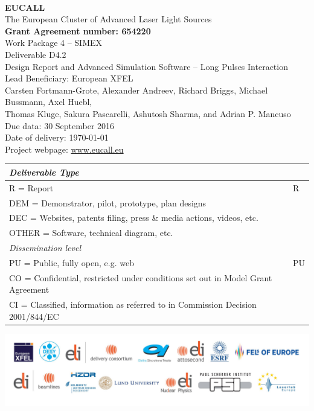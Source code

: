 \documentclass[10pt]{scrartcl}
\begin{document}
\makeatletter
\begin{titlepage}
\thispagestyle{scrheadings}
\begin{center}
$~$\\
\vspace{0cm}
{\Large\textbf{EUCALL}\\[2ex]
The European Cluster of Advanced Laser Light Sources}\\[4ex]
%
{\small\textbf{Grant Agreement number: 654220}}\\[8ex]
%
Work Package 4 -- SIMEX\\[4ex]
%
Deliverable D4.2\\
%
Design Report and Advanced Simulation Software -- Long Pulses
Interaction\\[5ex]
%
Lead Beneficiary: European XFEL\\[5ex]
%
Carsten Fortmann-Grote, Alexander Andreev, Richard Briggs, Michael Bussmann,
  Axel Huebl,\\ Thomas Kluge,
  Sakura Pascarelli, Ashutosh Sharma, and Adrian P. Mancuso\\[4ex]
%
Due data: 30 September 2016\\
Date of delivery: \today \\[4ex]
%
Project webpage: \url{www.eucall.eu}\\[6ex]
%
{%
\small
\begin{tabular}{|l|l|}
  \hline
  \multicolumn{2}{|l|}{ \textit{Deliverable Type} } \\
  \hline
  R = Report\hfill & R \\
  DEM = Demonstrator, pilot, prototype, plan designs & \\
  DEC = Websites, patents filing, press \& media actions, videos, etc. & \\
  OTHER = Software, technical diagram, etc. & \\
  \hline
  \multicolumn{2}{|l|}{\textit{Dissemination level}} \\
  \hline
  PU = Public, fully open, e.g. web & PU \\
  CO = Confidential, restricted under conditions set out in Model Grant
  Agreement\hspace*{17ex}\  & \\
  CI = Classified, information as referred to in Commission Decision 2001/844/EC
  & \\
  \hline
\end{tabular}
}

\end{center}
%
\vfill
\includegraphics[width=\textwidth]{./PartnerLogos.pdf}
\normalfont
\end{titlepage}
\makeatother
\end{document}
